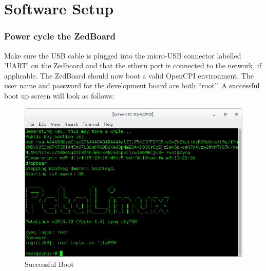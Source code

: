 \section{Software Setup}

%

\subsubsection*{Power cycle the ZedBoard}
Make sure the USB cable is plugged into the micro-USB connector labelled 'UART' on the Zedboard and that the ethern port is connected to the network, if applicable. The ZedBoard should now boot a valid OpenCPI environment.  The user name and password for the development board are both ``root''.  A successful boot up screen will look as follows:

\begin{figure}[H]
	\centerline{\includegraphics[scale=0.5]{zed_boot}}
	\caption{Successful Boot}
	\label{fig:boot1}
\end{figure}
